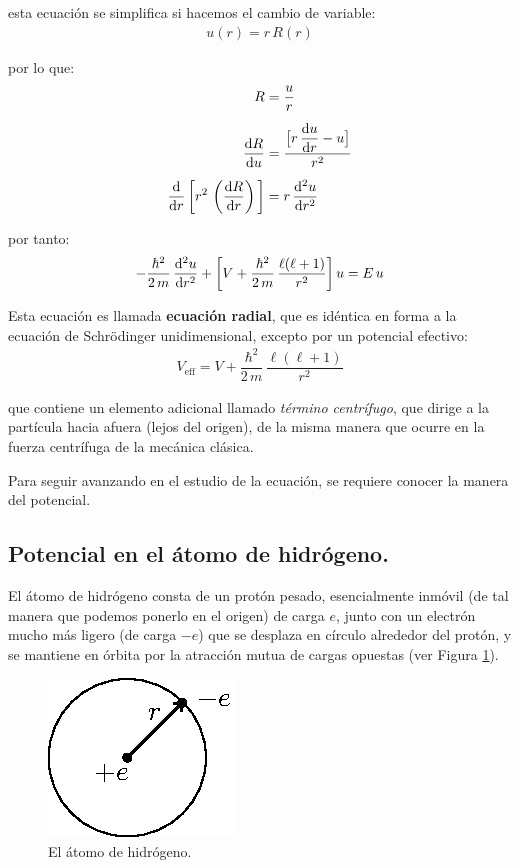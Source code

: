 esta ecuación se simplifica si hacemos el cambio de variable:
\begin{align}
u(r) = r \, R(r)
\label{eq:ecuacion_04_36}
\end{align}

por lo que:
\begin{align*}
R &= \dfrac{u}{r} \\[0.5em]
\dv{R}{u} &= \dfrac{ \big[ r \, \displaystyle \dv{u}{r} - u \big]}{r^{2}} \\[0.5em]
\dv{r} \, \bigg[ r^{2} \, \left( \dv{R}{r} \right) \bigg] &= r \, \dv[2]{u}{r}
\end{align*}

por tanto:
\begin{align}
- \dfrac{\hbar^{2}}{2 \, m} \, \dv[2]{u}{r} + \bigg[ V + \dfrac{\hbar^{2}}{2 \, m} \,\dfrac{\ell (\ell + 1)}{r^{2}} \bigg] \, u =  E \, u
\label{eq:ecuacion_04_37}
\end{align}

Esta ecuación es llamada \textbf{ecuación radial}, que es idéntica en forma a la ecuación de Schrödinger unidimensional, excepto por un potencial efectivo:
\begin{align}
V_{\mbox{eff}} = V + \dfrac{\hbar^{2}}{2 \, m} \,\dfrac{\ell (\ell + 1)}{r^{2}}
\label{eq:ecuacion_04_38}
\end{align}

que contiene un elemento adicional llamado \emph{término centrífugo}, que dirige a la partícula hacia afuera (lejos del origen), de la misma manera que ocurre en la fuerza centrífuga de la mecánica clásica.
\par
Para seguir avanzando en el estudio de la ecuación, se requiere conocer la manera del potencial.

\subsection{Potencial en el átomo de hidrógeno.}

El átomo de hidrógeno consta de un protón pesado, esencialmente inmóvil (de tal manera que podemos ponerlo en el origen) de carga $e$, junto con un electrón mucho más ligero (de carga $-e$) que se desplaza en círculo alrededor del protón, y se mantiene en órbita por la atracción mutua de cargas opuestas (ver Figura \ref{fig:figura_01}).
\begin{figure}[H]
    \centering
    \includegraphics[scale=1.5]{Imagenes/atomohidrogeno.eps}
    \caption{El átomo de hidrógeno.}
    \label{fig:figura_01}
\end{figure}


